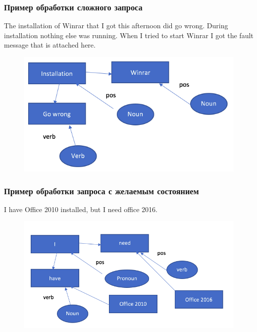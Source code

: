 \documentclass[14pt]{beamer}
\begin{document}
\begin{frame}
\frametitle{Пример обработки сложного запроса}
The installation of Winrar that I got this afternoon did go wrong. During installation nothing else was running. When I tried to start Winrar I got the fault message that is attached here.
\begin{figure} [h] 
  \center
  \includegraphics [scale=0.5] {Request2}
  \label{img:Request2}  
\end{figure}
\end{frame}


\begin{frame}
\frametitle{Пример обработки запроса с желаемым состоянием}
I have Office 2010 installed, but I need office 2016.
\begin{figure} [h] 
  \center
  \includegraphics [scale=0.5] {Request3}
  \label{img:Request3}  
\end{figure}
\end{frame}
\end{document}
